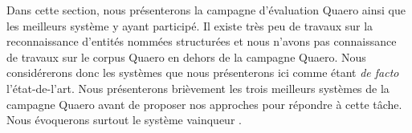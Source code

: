\documentclass[PhD-Yoann-Dupont.tex]{subfiles}
\begin{document}
Dans cette section, nous présenterons la campagne d'évaluation Quaero \citep{galibert2011structured} ainsi que les meilleurs système y ayant participé. Il existe très peu de travaux sur la reconnaissance d'entités nommées structurées et nous n'avons pas connaissance de travaux sur le corpus Quaero en dehors de la campagne Quaero. Nous considérerons donc les systèmes que nous présenterons ici comme étant \emph{de facto} l'état-de-l'art. Nous présenterons brièvement les trois meilleurs systèmes de la campagne Quaero avant de proposer nos approches pour répondre à cette tâche. Nous évoquerons surtout le système vainqueur \citet{dinarelli2012}.
\end{document}
